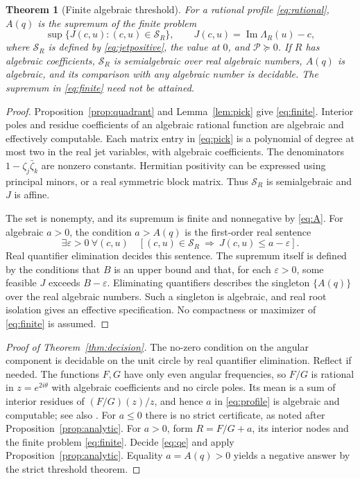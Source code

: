 \documentclass[11pt,a4paper]{article}
\newtheorem{theorem}{Theorem}[section]
\theoremstyle{remark}\newtheorem{remark}[theorem]{Remark}
\newcommand{\Ima}{\operatorname{Im}}
\begin{document}
\begin{theorem}[Finite algebraic threshold]\label{thm:algebraic}
For a rational profile \eqref{eq:rational}, \(A(q)\) is the
supremum of the finite problem
\begin{equation}\label{eq:finite}
 \sup\{J(c,u): (c,u)\in\mathcal S_R\},\qquad
 J(c,u)=\Ima\Lambda_R(u)-c,
\end{equation}
where \(\mathcal S_R\) is defined by \eqref{eq:jetpositive}, the
value at \(0\), and \(\mathcal P\succeq0\).
If \(R\) has algebraic coefficients, \(\mathcal S_R\) is
semialgebraic over real algebraic numbers, \(A(q)\) is algebraic,
and its comparison with any algebraic number is decidable.
The supremum in \eqref{eq:finite} need not be attained.
\end{theorem}
\begin{proof}
Proposition~\ref{prop:quadrant} and Lemma~\ref{lem:pick} give
\eqref{eq:finite}. Interior poles and residue coefficients of
an algebraic rational function are algebraic and effectively
computable. Each matrix entry in \eqref{eq:pick} is a polynomial
of degree at most two in the real jet variables, with algebraic
coefficients. The denominators \(1-\zeta_j\bar\zeta_k\) are
nonzero constants. Hermitian positivity can be expressed using
principal minors, or a real symmetric block matrix.
Thus \(\mathcal S_R\) is semialgebraic and \(J\) is affine.

The set is nonempty, and its supremum is finite and nonnegative
by \eqref{eq:A}. For algebraic \(a>0\), the condition \(a>A(q)\)
is the first-order real sentence
\begin{equation}\label{eq:qe}
 \exists\varepsilon>0\ \forall(c,u)\quad
 [(c,u)\in\mathcal S_R\ \Longrightarrow\ J(c,u)\leq a-\varepsilon].
\end{equation}
Real quantifier elimination \cite{tarski} decides this sentence.
The supremum itself is defined by the conditions that \(B\)
is an upper bound and that, for each \(\varepsilon>0\), some
feasible \(J\) exceeds \(B-\varepsilon\).
Eliminating quantifiers describes the singleton \(\{A(q)\}\)
over the real algebraic numbers. Such a singleton is algebraic,
and real root isolation gives an effective specification.
No compactness or maximizer of \eqref{eq:finite} is assumed.
\end{proof}

\begin{proof}[Proof of Theorem~\ref{thm:decision}]
The no-zero condition on the angular component is decidable on
the unit circle by real quantifier elimination. Reflect if needed.
The functions \(F,G\) have only even angular frequencies, so \(F/G\)
is rational in \(z=e^{2i\theta}\) with algebraic coefficients and
no circle poles. Its mean is a sum of interior residues of
\((F/G)(z)/z\), and hence \(a\) in \eqref{eq:profile} is algebraic
and computable; see also \cite[Supplement, Theorem~20.3]{korda}.
For \(a\leq0\) there is no strict certificate,
as noted after Proposition~\ref{prop:analytic}. For \(a>0\),
form \(R=F/G+a\), its interior nodes and the finite problem
\eqref{eq:finite}. Decide \eqref{eq:qe} and apply
Proposition~\ref{prop:analytic}. Equality \(a=A(q)>0\) yields
a negative answer by the strict threshold theorem.
\end{proof}
\end{document}
